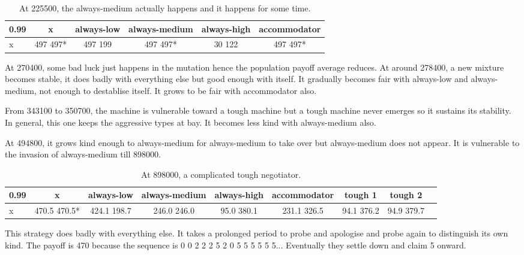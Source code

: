 \documentclass[12.5pt]{report}
\begin{document}
\begin{table}[h!]
\center
\begin{tabular}{l|ccccc}
\textbf{0.99}& x & always-low & always-medium & always-high & accommodator\\
\hline

x & 497 497* & 497 199  &  497 497*  & 30 122  &  497 497*  \\
\end{tabular}
\caption{At 225500, the always-medium actually happens and it happens for some time.}
\end{table}

At 270400, some bad luck just happens in the mutation hence the population payoff average reduces. At around 278400, a new mixture becomes stable, it does badly with everything else but good enough with itself. It gradually becomes fair with always-low and always-medium, not enough to destablise itself. It grows to be fair with accommodator also.

From 343100 to 350700, the machine is vulnerable toward a tough machine but a tough machine never emerges so it sustains its stability. In general, this one keeps the aggressive types at bay. It becomes less kind with always-medium also.

At 494800, it grows kind enough to always-medium for always-medium to take over but always-medium does not appear. It is vulnerable to the invasion of always-medium till 898000. 
\begin{table}[h!]
\center
\begin{tabular}{l|cccccccc}
\textbf{0.99}& x & always-low & always-medium & always-high & accommodator &tough 1 & tough 2\\
\hline
x& 470.5 470.5* &424.1 198.7&  246.0 246.0 &  95.0 380.1 & 231.1 326.5&   94.1 376.2 &  94.9 379.7\\  
\end{tabular}
\caption{At 898000, a complicated tough negotiator.}
\end{table}
This strategy does badly with everything else. It takes a prolonged period to probe and apologise and probe again to distinguish its own kind. The payoff is 470 because the sequence is 0 0 2 2 2 5 2 0 5 5 5 5 5 5... Eventually they settle down and claim 5 onward.
\end{document}
